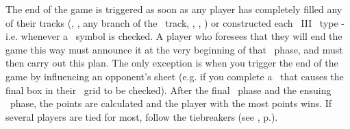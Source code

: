 The end of the game is triggered as soon as any player has completely filled any of their tracks (\population, \currency, any branch of the \tech\ track, \military, \trade, \culture) or constructed each \level\ III \armament\  type - i.e. whenever a \masterysymbol\ symbol is checked.
\newline\newline
A player who foresees that they will end the game this way must announce it at the very beginning of that \development\ phase, and must then carry out this plan.  The only exception is when you trigger the end of the game by influencing an opponent's sheet (e.g. if you complete a \convoy\ that causes the final box in their \culture\ grid to be checked).
\newline\newline
After the final \development\ phase and the ensuing \deployment\ phase, the points are calculated and the player with the most points wins. If several players are tied for most, follow the tiebreakers (see , p.\pageref{sec:scoring}).
